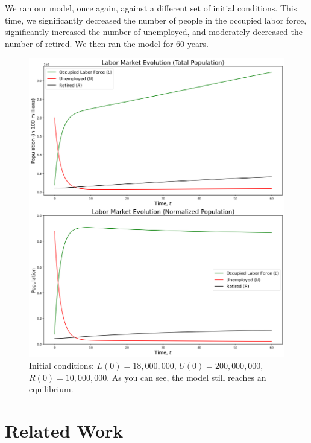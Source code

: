 \documentclass{article}
\begin{document}
We ran our model, once again, against a different set of initial conditions. This time, we significantly decreased the number of people in the occupied
labor force, significantly increased the number of unemployed, and moderately decreased the number of retired. We then ran the model for 60 years.

\begin{figure}[h]
    \centering
    \includegraphics[width=.5\textwidth]{figures/results_lur_3.png}
    \caption{Initial conditions: $L(0) = 18,000,000$, $U(0) = 200,000,000$, $R(0) = 10,000,000$. As you can see, the model still reaches an equilibrium.}
    \label{fig:results_lur_1}
\end{figure}






\section{Related Work}



\newpage 


\end{document}
